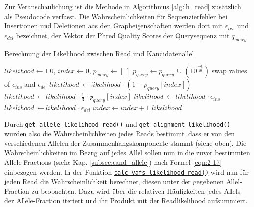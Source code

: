 Zur Veranschaulichung ist die Methode in Algorithmus \ref{alg:lh_read} zusätzlich als Pseudocode verfasst. Die Wahrscheinlichkeiten für Sequenzierfehler bei Insertionen und Deletionen aus den Grapheigenschaften werden dort mit $ \epsilon_{ins} $ und $ \epsilon_{del} $ bezeichnet, der Vektor der Phred Quality Scores der Querysequenz mit $q_{query}$
\newpage
\begin{algorithm}[H]
	\caption{Berechnung der Likelihood zwischen Read und Kandidatenallel}  \label{alg:lh_read}
	\begin{algorithmic}[1]	
		\State $ likelihood \gets 1.0 $, $ index \gets 0 $, $ p_{query} \gets [\;] $
		\State $p_{query} \gets p_{query}\, \cup \, (10^{\frac{-q_{i}}{10}}) $
		\EndFor			
		\State swap values of $ \epsilon_{ins} $ and $ \epsilon_{del} $
		\EndIf
		\State $ likelihood\, \gets likelihood \,\cdotp (1-p_{query}[index]) $
		\EndIf
		\State $ likelihood\, \gets likelihood \,\cdotp \frac{1}{3} \,\cdotp p_{query}[index] $
		\EndIf
		\State $ likelihood\, \gets likelihood \,\cdotp \epsilon_{ins}$
		\EndIf
		\State $ likelihood\, \gets likelihood \,\cdotp \epsilon_{del} $
		\EndIf
		\State $index \gets index + 1 $
		\EndWhile
		\EndFor
		\State \Return $likelihood$
		\EndFunction		
	\end{algorithmic}
\end{algorithm}

Durch \lstinline|get_allele_likelihood_read()| und \lstinline|get_alignment_likelihood()| wurden also die Wahrscheinlichkeiten jedes Reads bestimmt, dass er von den verschiedenen Allelen der Zusammenhangskomponente stammt (siehe oben). Die Wahrscheinlichkeiten im Bezug auf jedes Allel sollen nun in die zuvor bestimmten Allele-Fractions (siehe Kap. \ref{subsec:cand_allele}) nach Formel \eqref{eqn:2-17} einbezogen werden. In der Funktion \hyperref[schritt10]{\lstinline|calc_vafs_likelihood_read()|\label{schritt10txt}} wird nun für jeden Read die Wahrscheinlichkeit berechnet, diesen unter der gegebenen Allel-Fraction zu beobachten. Dazu wird über die relativen Häufigkeiten jedes Allels der Allele-Fraction iteriert und ihr Produkt mit der Readlikelihood aufsummiert. \\

